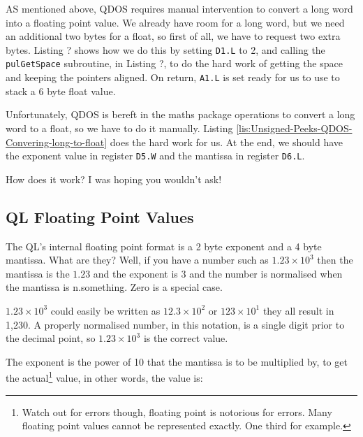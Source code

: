 AS mentioned above, QDOS requires manual intervention to convert a
long word into a floating point value. We already have room for a
long word, but we need an additional two bytes for a float, so first
of all, we have to request two extra bytes. Listing ? shows how we
do this by setting \texttt{D1.L} to 2, and calling the \texttt{pulGetSpace}
subroutine, in Listing ?, to do the hard work of getting the space
and keeping the pointers aligned. On return, \texttt{A1.L} is set
ready for us to use to stack a 6 byte float value. 



Unfortunately, QDOS is bereft in the maths package operations to convert
a long word to a float, so we have to do it manually. Listing \ref{lis:Unsigned-Peeks-QDOS-Convering-long-to-float}
does the hard work for us. At the end, we should have the exponent
value in register \texttt{D5.W} and the mantissa in register \texttt{D6.L}. 



How does it work? I was hoping you wouldn't ask!

\subsection{QL Floating Point Values}

The QL's internal floating point format is a 2 byte exponent and a
4 byte mantissa. What are they? Well, if you have a number such as
$1.23\times10^{3}$ then the mantissa is the $1.23$ and the exponent
is $3$ and the number is \textquotedbl normalised\textquotedbl{} when
the mantissa is \textquotedbl n.something\textquotedbl . Zero is a
special case.

$1.23\times10^{3}$ could easily be written as $12.3\times10^{2}$
or $123\times10^{1}$ they all result in 1,230. A properly normalised
number, in this notation, is a single digit prior to the decimal point,
so $1.23\times10^{3}$ is the correct value.

The exponent is the power of 10 that the mantissa is to be multiplied
by, to get the actual\footnote{Watch out for errors though, floating point is notorious for errors.
Many floating point values cannot be represented exactly. One third
for example. } value, in other words, the value is:

